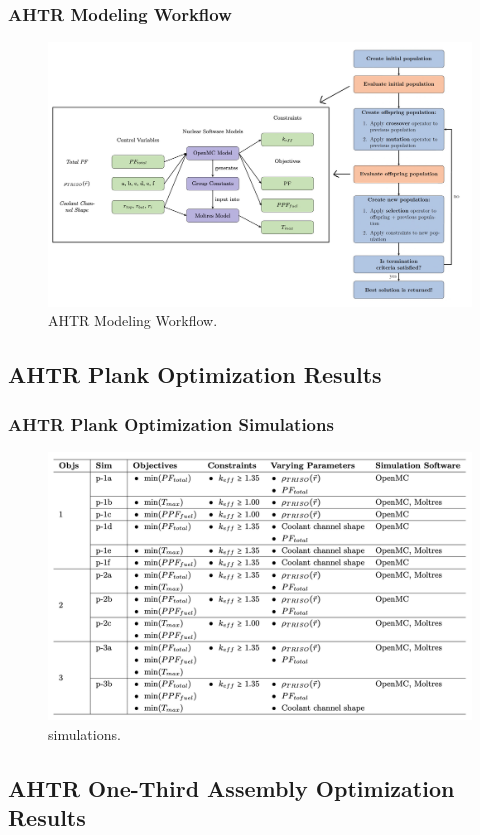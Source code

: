 \begin{frame}
    \frametitle{AHTR Modeling Workflow}
    \begin{figure}
        \includegraphics[width=0.95\linewidth]{figures/ahtr-modeling-workflow.png} 
        \caption{AHTR Modeling Workflow.}
    \end{figure}
\end{frame}

\subsection{AHTR Plank Optimization Results}
\frametitle{AHTR Plank Optimization Simulations}
\begin{frame}
\begin{figure}
    \includegraphics[width=0.95\linewidth]{figures/ahtr-plank-opt-table.png} 
    \caption{simulations.}
\end{figure}
\end{frame}

\subsection{AHTR One-Third Assembly Optimization Results}